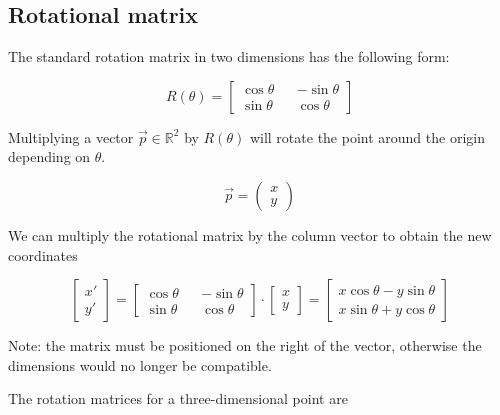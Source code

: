\documentclass{article}
\begin{document}
%
%

\pagebreak

\subsection{Rotational matrix}

The standard rotation matrix in two dimensions has the following form:

\[
    R(\theta)=
    \begin{bmatrix} 
        \cos\theta && -\sin\theta \\
        \sin\theta && \cos\theta
    \end{bmatrix}
\]

Multiplying a vector \(\vec{p}\in \mathbb{R}^2\) by \(R(\theta)\) will rotate the point around the origin depending on \(\theta\).

\[
    \vec{p}=
    \begin{pmatrix} 
        x \\
        y
    \end{pmatrix}
\]

We can multiply the rotational matrix by the column vector to obtain the new coordinates

\[
    \begin{bmatrix} 
        x' \\
        y'
    \end{bmatrix}
    =
    \begin{bmatrix} 
        \cos\theta && -\sin\theta \\
        \sin\theta && \cos\theta
    \end{bmatrix}
    \cdot
    \begin{bmatrix} 
        x \\
        y
    \end{bmatrix}
    =
    \begin{bmatrix} 
        x\cos\theta - y\sin\theta \\
        x\sin\theta + y\cos\theta
    \end{bmatrix}
\]

Note: the matrix must be positioned on the right of the vector, otherwise the dimensions would no longer be compatible.

The rotation matrices for a three-dimensional point are
\end{document}
